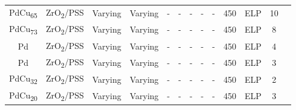\begin{longtable}{@{\extracolsep{\fill}}ccccccccccccc@{}}
    PdCu\textsubscript{65}                       & ZrO\textsubscript{2}/PSS              &  Varying   & Varying          & -               & -  & -       & -                             & -        & 450                                    & ELP                  & 10                                                                             & \cite{Kulprathipanja2005}                  \\

    PdCu\textsubscript{73}                       & ZrO\textsubscript{2}/PSS              &  Varying   & Varying          & -               & -  & -       & -                             & -        & 450                                    & ELP                  & 8                                                                             & \cite{Kulprathipanja2005}                  \\


    Pd                       & ZrO\textsubscript{2}/PSS              &  Varying   & Varying          & -               & -  & -       & -                             & -        & 450                                    & ELP                  & 4                                                                             & \cite{Kulprathipanja2005}                  \\

    Pd                       & ZrO\textsubscript{2}/PSS              &  Varying   & Varying          & -               & -  & -       & -                             & -        & 450                                    & ELP                  & 3                                                                             & \cite{Kulprathipanja2005}                  \\

    PdCu\textsubscript{32}                       & ZrO\textsubscript{2}/PSS              &  Varying   & Varying          & -               & -  & -       & -                             & -        & 450                                    & ELP                  & 2                                                                             & \cite{Kulprathipanja2005}                  \\

    PdCu\textsubscript{20}                       & ZrO\textsubscript{2}/PSS              &  Varying   & Varying          & -               & -  & -       & -                             & -        & 450                                    & ELP                  & 3                                                                             & \cite{Kulprathipanja2005}                  \\


\end{longtable}
